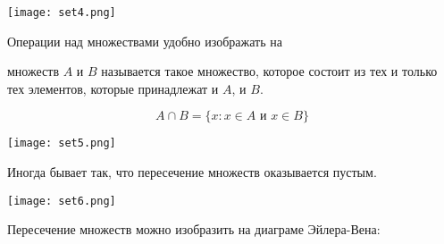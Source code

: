 \documentclass[12pt, a4paper]{article}
\begin{document}
\begin{center}
    \texttt{[image: set4.png]}
\end{center}

Операции над множествами удобно изображать на 

\begin{center}
\end{center}

\begin{mydef} 
 множеств $A$ и $B$ называется такое множество, которое состоит из тех и только тех  элементов, которые принадлежат и $A$, и $B$.
  
  \[A \cap B = \{x: x \in A \text{ и } x \in B \} \]
\end{mydef} 

\begin{center}
    \texttt{[image: set5.png]}
\end{center}

Иногда бывает так, что пересечение множеств оказывается пустым.

\begin{center}
    \texttt{[image: set6.png]}
\end{center}

Пересечение множеств можно изобразить на диаграме Эйлера-Вена:
\end{document}

